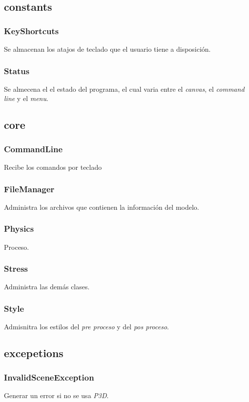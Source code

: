 \subsection{constants}
\subsubsection{KeyShortcuts}
Se almacenan los atajos de teclado que el usuario tiene a disposición.
\subsubsection{Status}
Se almecena el el estado del programa, el cual varia entre el \textit{canvas}, el \textit{command line} y el \textit{menu}.

\subsection{core}
\subsubsection{CommandLine}
Recibe los comandos por teclado
\subsubsection{FileManager}
Administra los archivos que contienen la información del modelo.
\subsubsection{Physics}
Proceso.
\subsubsection{Stress}
Administra las demás clases.
\subsubsection{Style}
Admisnitra los estilos del \textit{pre proceso} y del \textit{pos proceso}.

\subsection{excepetions}
\subsubsection{InvalidSceneException}
Generar un error si no se usa \textit{P3D}.

